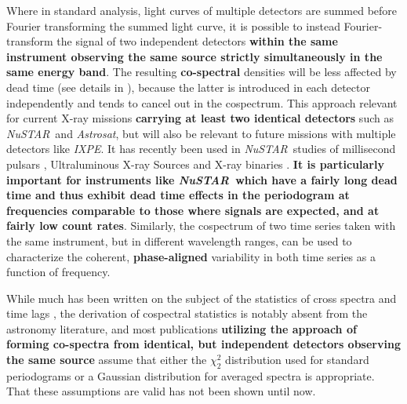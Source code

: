 \documentclass[12pt]{emulateapj}
\newcommand{\project}[1]{\textsl{#1}}
\newcommand{\nustar}{\project{NuSTAR}\xspace}
\newcommand{\astrosat}{\project{Astrosat}\xspace}
\newcommand{\ixpe}{\project{IXPE}\xspace}
\begin{document}
Where in standard analysis, light curves of multiple detectors are summed before Fourier transforming the summed light curve, it is possible to instead Fourier-transform the signal of two independent detectors \textbf{within the same instrument observing the same source strictly simultaneously in the same energy band}. 
The resulting \textbf{co-spectral} densities will be less affected by dead time (see details in \citealt{Bachetti+15}), because the latter is introduced in each detector independently and tends to cancel out in the cospectrum.
This approach relevant for current X-ray missions \textbf{carrying at least two identical detectors} such as \nustar\ and \astrosat, but will also be relevant to future missions with multiple detectors like \ixpe. It has recently been used in \nustar\ studies of millisecond pulsars \citep{ferrigno2017}, Ultraluminous X-ray Sources \citep{bachetti2016} and X-ray binaries \citep{barriere2015,zoghbi2016,ingram2016,huppenkothen2017,stiele2017}. \textbf{It is particularly important for instruments like \nustar\ which have a fairly long dead time and thus exhibit dead time effects in the periodogram at frequencies comparable to those where signals are expected, and at fairly low count rates}.  
Similarly, the cospectrum of two time series taken with the same instrument, but in different wavelength ranges, can be used to characterize the coherent, \textbf{phase-aligned} variability in both time series as a function of frequency.

While much has been written on the subject of the statistics of cross spectra and time lags \citep[e.g.][]{epitropakis2016}, the derivation of cospectral statistics is notably absent from the astronomy literature, and most publications \textbf{utilizing the approach of forming co-spectra from identical, but independent detectors observing the same source} assume that either the $\chi^2_2$ distribution used for standard periodograms or a Gaussian distribution for averaged spectra is appropriate. That these assumptions are valid has not been shown until now. 
\end{document}
